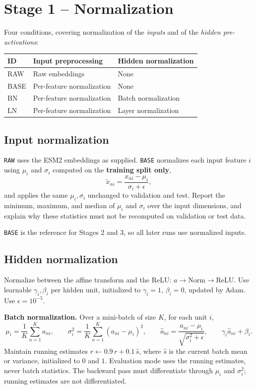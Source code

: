 \documentclass[11pt]{article}
\begin{document}
\section{Stage 1 -- Normalization}
Four conditions, covering normalization of the \emph{inputs} and of the \emph{hidden pre-activations}:

\begin{center}
\begin{tabular}{lll}
\toprule
ID & Input preprocessing & Hidden normalization \\
\midrule
RAW  & Raw embeddings & None \\
BASE & Per-feature normalization & None \\
BN   & Per-feature normalization & Batch normalization \\
LN   & Per-feature normalization & Layer normalization \\
\bottomrule
\end{tabular}
\end{center}

\subsection*{Input normalization}
\texttt{RAW} uses the ESM2 embeddings as supplied. \texttt{BASE} normalizes each input feature $i$ using $\mu_i$ and $\sigma_i$ computed on the \textbf{training split only},
\[
\tilde{x}_{ni}=\frac{x_{ni}-\mu_i}{\sigma_i+\epsilon},
\]
and applies the same $\mu_i,\sigma_i$ unchanged to validation and test. Report the minimum, maximum, and median of $\mu_i$ and $\sigma_i$ over the input dimensions, and explain why these statistics must not be recomputed on validation or test data.

\texttt{BASE} is the reference for Stages 2 and 3, so all later runs use normalized inputs.

\subsection*{Hidden normalization}
Normalize between the affine transform and the ReLU: $a \rightarrow \text{Norm} \rightarrow \text{ReLU}$. Use learnable $\gamma_i,\beta_i$ per hidden unit, initialized to $\gamma_i=1$, $\beta_i=0$, updated by Adam. Use $\epsilon=10^{-5}$.

\textbf{Batch normalization.} Over a mini-batch of size $K$, for each unit $i$,
\[
\mu_i=\frac{1}{K}\sum_{n=1}^{K} a_{ni},\qquad
\sigma_i^2=\frac{1}{K}\sum_{n=1}^{K}(a_{ni}-\mu_i)^2,\qquad
\hat{a}_{ni}=\frac{a_{ni}-\mu_i}{\sqrt{\sigma_i^2+\epsilon}},\qquad
\gamma_i\hat{a}_{ni}+\beta_i.
\]
Maintain running estimates $r \leftarrow 0.9\,r + 0.1\,\hat{s}$, where $\hat{s}$ is the current batch mean or variance, initialized to $0$ and $1$. Evaluation mode uses the running estimates, never batch statistics. The backward pass must differentiate through $\mu_i$ and $\sigma_i^2$; running estimates are not differentiated.
\end{document}
